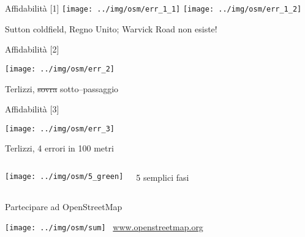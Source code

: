 \documentclass[xcolor=svgnames]{beamer}
\begin{document}

	\begin{frame}{Affidabilità [1]}
		\texttt{[image: ../img/osm/err\_1\_1]}
		\hfill
		\texttt{[image: ../img/osm/err\_1\_2]}
		\begin{center}
			Sutton coldfield, Regno Unito; Warvick Road non esiste!
		\end{center}
	\end{frame}


	\begin{frame}{Affidabilità [2]}
		\begin{center}
			\texttt{[image: ../img/osm/err\_2]}
		\end{center}
		\begin{center}
			Terlizzi, \st{sovra} sotto--passaggio
		\end{center}
	\end{frame}


	\begin{frame}{Affidabilità [3]}
		\begin{center}
			\texttt{[image: ../img/osm/err\_3]}
		\end{center}
		\begin{center}
			Terlizzi, 4 errori in 100 metri
		\end{center}
	\end{frame}


	\begin{frame}
		\begin{columns}[c]
				\begin{center}
					\texttt{[image: ../img/osm/5\_green]}
				\end{center}
				\Huge 5 semplici fasi
		\end{columns}
	\end{frame}


	\begin{frame}{Partecipare ad OpenStreetMap}
		\begin{center}
			\texttt{[image: ../img/osm/sum]}
			\vfill
			\huge \HandCuffRightUp~\url{www.openstreetmap.org}
		\end{center}
	\end{frame}
\end{document}
